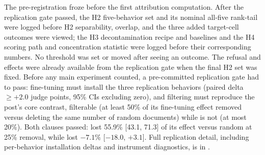The pre-registration froze before the first attribution computation. After
the replication gate passed, the H2 five-behavior set and its nominal
all-five rank-tail were logged before H2 separability, overlap, and the
three added target-cell outcomes were viewed;
the H3 decontamination recipe and baselines and the H4 scoring path and
concentration statistic were logged before their corresponding numbers.
No threshold was set or moved after seeing an outcome. The refusal and
 effects were already available from the replication
gate when the final H2 set was fixed. Before any main experiment counted, a
pre-committed replication gate had to pass: fine-tuning must install the
three replication behaviors (paired delta $\geq +2.0$ judge points, 95\%
CIs excluding zero), and filtering must reproduce the post's core
contrast,  filterable (at least 50\% of its fine-tuning
effect removed versus deleting the same number of random documents) while
 is not (at most 20\%). Both clauses passed:
 lost 55.9\% [43.1, 71.3] of its effect versus random
at 25\% removal, while  lost $-7.1\%$
[$-18.0$, $+3.1$]. Full replication detail, including per-behavior
installation deltas and instrument diagnostics, is in
.
